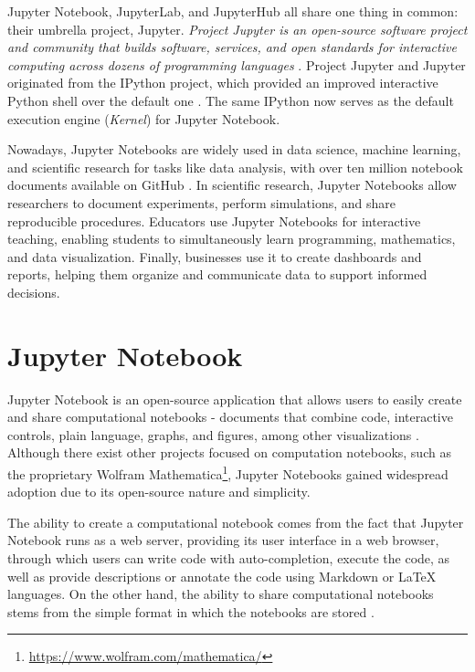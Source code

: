 \documentclass[
  digital,     %
  oneside,     %
  nosansbold,  %
  nocolorbold, %
  lof,         %
  nolot,         %
]{fithesis4}
\begin{document}
Jupyter Notebook, JupyterLab, and JupyterHub all share one thing in common: their umbrella project, Jupyter.
\emph{Project Jupyter is an open-source software project and community that builds software, services, and open standards for interactive computing across dozens of programming languages} \cite{granger2021jupyter}.
Project Jupyter and Jupyter originated from the IPython project, which provided an improved interactive Python shell over the default one \cite{ipython}. The same IPython now serves as the default execution engine (\emph{Kernel}) for Jupyter Notebook.

Nowadays, Jupyter Notebooks are widely used in data science, machine learning, and scientific research for tasks like data analysis, with over ten million notebook documents available on GitHub \cite{granger2021jupyter}. In scientific research, Jupyter Notebooks allow researchers to document experiments, perform simulations, and share reproducible procedures. Educators use Jupyter Notebooks for interactive teaching, enabling students to simultaneously learn programming, mathematics, and data visualization. 
Finally, businesses use it to create dashboards and reports, helping them organize and communicate data to support informed decisions.

\section{Jupyter Notebook}
Jupyter Notebook is an open-source application that allows users to easily create and share computational notebooks - documents that combine code, interactive controls, plain language, graphs, and figures, among other visualizations \cite{granger2021jupyter}. Although there exist other projects focused on computation notebooks, such as the proprietary Wolfram Mathematica\footnote{\url{https://www.wolfram.com/mathematica/}}, Jupyter Notebooks gained widespread adoption due to its open-source nature and simplicity.

The ability to create a computational notebook comes from the fact that Jupyter Notebook runs as a web server, providing its user interface in a web browser, through which users can write code with auto-completion, execute the code, as well as provide descriptions or annotate the code using Markdown or LaTeX languages. On the other hand, the ability to share computational notebooks stems from the simple format in which the notebooks are stored \cite{jupyter_notebook}.
\end{document}
